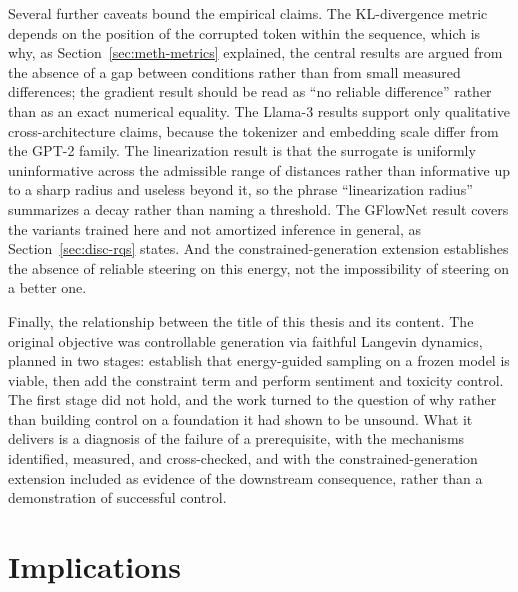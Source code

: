 Several further caveats bound the empirical claims. The KL-divergence metric depends on the position of the corrupted token within the sequence, which is why, as Section~\ref{sec:meth-metrics} explained, the central results are argued from the absence of a gap between conditions rather than from small measured differences; the gradient result should be read as ``no reliable difference'' rather than as an exact numerical equality. The Llama-3 results support only qualitative cross-architecture claims, because the tokenizer and embedding scale differ from the GPT-2 family. The linearization result is that the surrogate is uniformly uninformative across the admissible range of distances rather than informative up to a sharp radius and useless beyond it, so the phrase ``linearization radius'' summarizes a decay rather than naming a threshold. The GFlowNet result covers the variants trained here and not amortized inference in general, as Section~\ref{sec:disc-rqs} states. And the constrained-generation extension establishes the absence of reliable steering on this energy, not the impossibility of steering on a better one.

Finally, the relationship between the title of this thesis and its content. The original objective was controllable generation via faithful Langevin dynamics, planned in two stages: establish that energy-guided sampling on a frozen model is viable, then add the constraint term and perform sentiment and toxicity control. The first stage did not hold, and the work turned to the question of why rather than building control on a foundation it had shown to be unsound. What it delivers is a diagnosis of the failure of a prerequisite, with the mechanisms identified, measured, and cross-checked, and with the constrained-generation extension included as evidence of the downstream consequence, rather than a demonstration of successful control.

\section{Implications}
\label{sec:disc-future}

